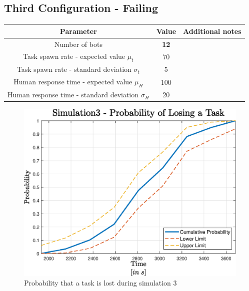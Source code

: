 \documentclass[10pt,a4paper]{article}
\begin{document}
		\subsection{Third Configuration - Failing}
			\begin{center}
				\begin{tabular}{ |c|c|c|}
					\hline
					Parameter & Value & Additional notes\\
					\hline
					\hline
					Number of bots & \textbf{12} &\\
					\hline
					Task spawn rate - expected value $\mu_t$ & 70 &\\
					\hline					
					Task spawn rate - standard deviation $\sigma_t$ & 5 &\\
					\hline
					Human response time - expected value $\mu_H$ & 100 &\\
					\hline					
					Human response time - standard deviation $\sigma_H$ & 20 &\\
					\hline
				\end{tabular}
			\end{center}
			\begin{figure}[H]
				\centering
					\includegraphics[scale = 0.7]{Images/Simulation3}
					\caption{Probability that a task is lost during simulation 3}
			\end{figure}
\end{document}
